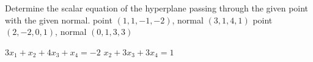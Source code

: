 
\begin{Exercise}[
name={},
title={}, 
difficulty=0,
origin={\cite{SM}}]
Determine the scalar equation of the hyperplane passing through the given point with the given normal.
\Question point $(1,1,-1,-2)$, normal $(3,1,4,1)$
\Question point $(2,-2,0,1)$, normal $(0,1,3,3)$
\end{Exercise}

\begin{Answer}
\Question $3x_1+x_2+4x_3+x_4=-2$
\Question $x_2+3x_3+3x_4=1$
\end{Answer}
